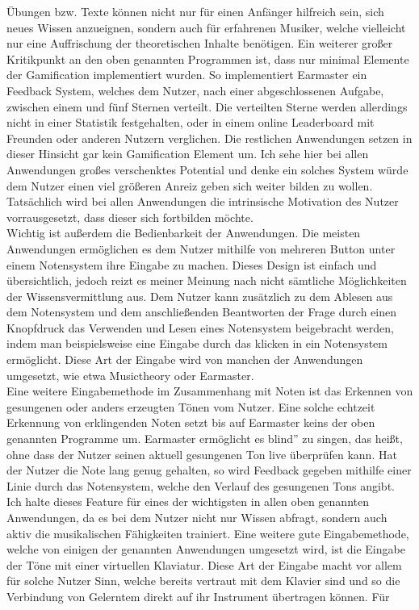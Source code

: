 Übungen bzw. Texte können nicht nur für einen Anfänger hilfreich sein, sich neues Wissen anzueignen, sondern auch für erfahrenen Musiker, welche vielleicht nur eine Auffrischung der theoretischen Inhalte benötigen. Ein weiterer großer Kritikpunkt an den oben genannten Programmen ist, dass nur minimal Elemente der Gamification implementiert wurden. So implementiert Earmaster ein Feedback System, 
welches dem Nutzer, nach einer abgeschlossenen Aufgabe, zwischen einem und fünf Sternen verteilt. Die verteilten Sterne werden allerdings nicht in einer Statistik festgehalten, oder in einem online Leaderboard mit Freunden oder anderen Nutzern verglichen. Die restlichen Anwendungen setzen in dieser Hinsicht gar kein Gamification Element um. Ich sehe hier bei allen Anwendungen großes verschenktes Potential und denke ein solches System würde dem Nutzer einen viel größeren Anreiz geben sich weiter bilden zu wollen. Tatsächlich wird bei allen Anwendungen die intrinsische Motivation des Nutzer vorrausgesetzt, dass dieser sich fortbilden möchte. \\ 
Wichtig ist außerdem die Bedienbarkeit der Anwendungen. Die meisten Anwendungen ermöglichen es dem Nutzer mithilfe von mehreren Button unter einem Notensystem ihre Eingabe zu machen. Dieses Design ist einfach und übersichtlich, jedoch reizt es meiner Meinung nach nicht sämtliche Möglichkeiten der Wissensvermittlung aus. Dem Nutzer kann zusätzlich zu dem Ablesen aus dem Notensystem und dem anschließenden Beantworten der Frage durch einen Knopfdruck das Verwenden und Lesen eines Notensystem beigebracht werden, indem man beispielsweise eine Eingabe durch das klicken in ein Notensystem ermöglicht. Diese Art der Eingabe wird von manchen der Anwendungen umgesetzt, wie etwa Musictheory oder Earmaster. \\
Eine weitere Eingabemethode im Zusammenhang mit Noten ist das Erkennen von gesungenen oder anders erzeugten Tönen vom Nutzer. Eine solche echtzeit Erkennung von erklingenden Noten setzt bis auf Earmaster keins der oben genannten Programme um. Earmaster ermöglicht es \glqq blind'' zu singen, das heißt, ohne dass der Nutzer seinen aktuell gesungenen Ton live überprüfen kann. Hat der Nutzer die 
Note lang genug gehalten, so wird Feedback gegeben mithilfe einer Linie durch das Notensystem, welche den Verlauf des gesungenen Tons angibt. Ich halte dieses Feature für eines der wichtigsten in allen oben genannten Anwendungen, da es bei dem Nutzer nicht nur Wissen abfragt, sondern auch aktiv die musikalischen Fähigkeiten trainiert.
Eine weitere gute Eingabemethode, welche von einigen der genannten Anwendungen umgesetzt wird, ist die Eingabe der Töne mit einer virtuellen Klaviatur. Diese Art der Eingabe macht vor allem für solche Nutzer Sinn, welche bereits vertraut mit dem Klavier sind und so die Verbindung von Gelerntem direkt auf ihr Instrument übertragen können. Für 
